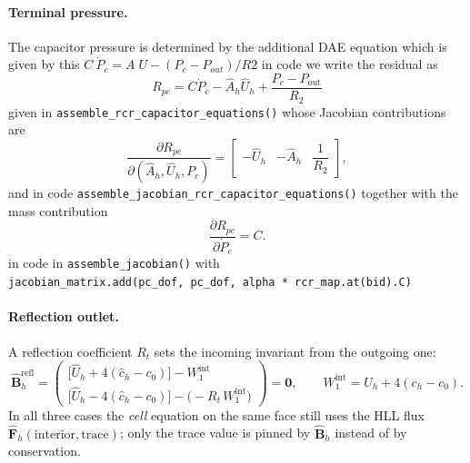 \documentclass[11pt]{article}
\begin{document}
\paragraph{Terminal pressure.}
The capacitor pressure is determined by the additional DAE equation which is given by this  $C \ \dot P_c = A\;U - (P_c - P_{out})/ R2$  in code we write the residual as 
\begin{equation}
R_{pc} = C \dot P_c  -
\widehat A_h\widehat U_h
+
\frac{P_c-P_{\mathrm{out}}}{R_2}
\label{eq:rcr_capacitor}
\end{equation}
given in \texttt{assemble\_rcr\_capacitor\_equations()}
whose Jacobian contributions are
\begin{equation}
\frac{\partial R_{pc}}
{\partial (\widehat A_h,\widehat U_h,P_c)} =
\begin{bmatrix}
-\widehat U_h &
-\widehat A_h &
\dfrac{1}{R_2}
\end{bmatrix},
\label{eq:rcr_cap_jac}
\end{equation}
and in code \texttt{assemble\_jacobian\_rcr\_capacitor\_equations()}
together with the mass contribution 
\begin{equation}
\frac{\partial R_{pc}}
{\partial \dot P_c} = C.
\label{eq:rcr_cap_mass}
\end{equation}
in code in \texttt{assemble\_jacobian()} with \\\texttt{jacobian\_matrix.add(pc\_dof, pc\_dof, alpha * rcr\_map.at(bid).C)}

\paragraph{Reflection outlet.} A reflection coefficient $R_t$ sets the incoming
invariant from the outgoing one:
\begin{equation}
  \widehat{\mathbf B}_h^{\mathrm{refl}}
  =
  \begin{pmatrix}
  \bigl[\widehat U_h+4(\widehat c_h-c_0)\bigr]-W_{1}^{\mathrm{int}}\\[6pt]
  \bigl[\widehat U_h-4(\widehat c_h-c_0)\bigr]-\bigl(-R_t\,W_{1}^{\mathrm{int}}\bigr)
  \end{pmatrix}
  =\mathbf 0,
  \qquad
  W_1^{\mathrm{int}}=U_h+4(c_h-c_0).
  \label{eq:bc_refl}
\end{equation}
In all three cases the \emph{cell} equation on the same face still uses the HLL
flux $\widehat{\mathbf F}_h(\text{interior},\text{trace})$; only the trace value
is pinned by $\widehat{\mathbf B}_h$ instead of by conservation.
\end{document}

